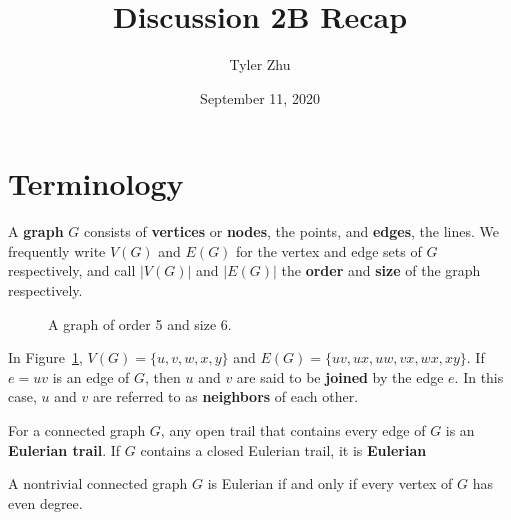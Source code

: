 \documentclass[11 pt]{scrartcl}
\newcommand{\hwtitle}{Discussion 2B Recap}
\begin{document}
 
\title{\Large \hwtitle{}}
\author{\large Tyler Zhu}
\date{\large September 11, 2020}

\maketitle 

\section{Terminology}

A \textbf{graph} $G$ consists of \textbf{vertices} or \textbf{nodes}, the points, and \textbf{edges}, the lines. We frequently write $V(G)$ and $E(G)$ for the vertex and edge sets of $G$ respectively, and call $|V(G)|$ and $|E(G)|$ the \textbf{order} and \textbf{size} of the graph respectively.
\begin{figure}[!htb]
    \centering
        \caption{A graph of order 5 and size 6.}
        \label{fig:simple}
\end{figure}

In Figure~\ref{fig:simple}, $V(G) = \{u,v,w,x,y\}$ and $E(G) = \{uv, ux, uw, vx, wx, xy\}$. If $e=uv$ is an edge of $G$, then $u$ and $v$ are said to be \textbf{joined} by the edge $e$. In this case, $u$ and $v$ are referred to as \textbf{neighbors} of each other.

For a connected graph $G$, any open trail that contains every edge of $G$ is an \textbf{Eulerian trail}. If $G$ contains a closed Eulerian trail, it is \textbf{Eulerian}

\begin{theorem}
    A nontrivial connected graph $G$ is Eulerian if and only if every vertex of $G$ has even degree.
\end{theorem}
\end{document}
